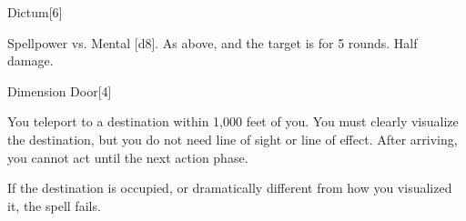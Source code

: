 \begin{spellsection}{Dictum}[6]
    \begin{spellheader}
    \end{spellheader}
    \begin{spellcontent}
        \begin{spelltargetinginfo}
        \end{spelltargetinginfo}
        \begin{spelleffects}
            \begin{spellattack}{Spellpower vs. Mental}
                \spellsuccess {}[d8].
                \spellcritical As above, and the target is \slowed for 5 rounds.
                \spellfailure Half damage.
            \end{spellattack}
        \end{spelleffects}
    \end{spellcontent}
    \begin{spellfooter}
        \miscastexplode
    \end{spellfooter}
\end{spellsection}

\begin{spellsection}{Dimension Door}[4]
    \begin{spellheader}
    \end{spellheader}
    \begin{spellcontent}
        \begin{spelltargetinginfo}
        \end{spelltargetinginfo}
        \begin{spelleffects}
            \spelleffect You teleport to a destination within 1,000 feet of you. You must clearly visualize the destination, but you do not need line of sight or line of effect. After arriving, you cannot act until the next action phase.

            If the destination is occupied, or dramatically different from how you visualized it, the spell fails.
        \end{spelleffects}
    \end{spellcontent}
    \begin{spellfooter}
        \miscastexplode
    \end{spellfooter}
\end{spellsection}

